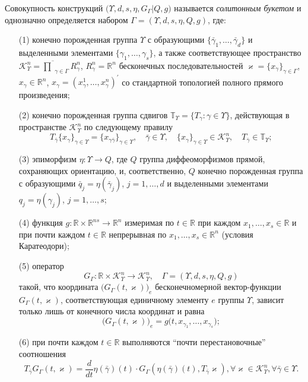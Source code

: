 Совокупность конструкций $\big(\Upsilon,d,s,\eta,G_\Gamma|Q,g\big)$ называется {\it солитонным букетом} и однозначно определяется набором $\Gamma=(\Upsilon,d,s,\eta,Q,g)$, где:
\begin{itemize}
\item[(1)] конечно порожденная группа $\Upsilon$ с образующими $\{\check{\gamma_1},\ldots,\check{\gamma_d}\}$ и выделенными элементами $\{\gamma_1,\ldots,\gamma_s\}$, а также соответствующее пространство $\mathcal K^n_\Upsilon=\overline{\prod}_{\gamma\in \Gamma} R^n_\gamma$, $R^n_\gamma=\mathbb R^n$ бесконечных последовательностей $\varkappa=\{x_\gamma\}_{\gamma\in \Gamma}$, $x_\gamma\in \mathbb R^n$, $x_\gamma=(x_\gamma^1,\ldots, x_\gamma^n)^{'}$ со стандартной топологией полного прямого произведения;
\item[(2)] конечно порожденная группа сдвигов $\mathbb T_\Upsilon=\{T_\gamma: \gamma \in \Upsilon\}$, действующая в пространстве $\mathcal K^n_\Upsilon$ по следующему правилу
    $$
    T_{\bar{\gamma}}\{x_\gamma\}_{\gamma \in \Upsilon }=\{x_{\gamma\bar{\gamma}}\}_{\gamma \in \Upsilon},\quad \bar{\gamma}\in \Upsilon,\quad \{x_\gamma\}_{\gamma \in \Upsilon }\in \mathcal K^n_\Upsilon,\quad T_{\bar{\gamma}} \in \mathbb T_\Upsilon;
    $$
\item[(3)] эпиморфизм $\eta: \Upsilon \rightarrow Q$, где $Q$ группа диффеоморфизмов прямой, сохраняющих ориентацию, и, соответственно, $Q$ конечно порожденная группа с образующими $\check{q_j}=\eta(\check{\gamma_j})$, $j=1,\ldots,d$ и выделенными элементами $q_j=\eta({\gamma_j})$, $j=1,\ldots,s$;
\item[(4)] функция $g:\mathbb R\times \mathbb R^{ns} \rightarrow \mathbb R^{n}$ измеримая по $t\in \mathbb R$ при каждом $x_1,\ldots,x_s\in \mathbb R$ и при почти каждом $t\in \mathbb R$ непрерывная по $x_1,\ldots,x_s\in \mathbb R^n$ (условия Каратеодори);
\item[(5)] оператор
$$
G_{\Gamma}: \mathbb R\times \mathcal K^n_\Upsilon \rightarrow \mathcal K^n_\Upsilon,\quad \Gamma=(\Upsilon,d,s,\eta,Q,g)
$$
такой, что координата $\big(G_{\Gamma}(t,\varkappa)\big)_e$ бесконечномерной вектор-функции $G_{\Gamma}(t,\varkappa)$, соответствующая единичному элементу $e$ группы $\Upsilon$, зависит только лишь от конечного числа координат и равна
$$
\big(G_{\Gamma}(t,\varkappa)\big)_e=g\big(t,x_{{\gamma}_1},\ldots,x_{{\gamma}_s}\big);
$$
\item[(6)] при почти каждом $t \in \mathbb R $ выполняются ``почти перестановочные'' соотношения
$$
T_{\bar\gamma} G_{\Gamma}(t,\varkappa)=\frac{d}{dt}\eta(\bar\gamma)(t)\cdot G_{\Gamma}(\eta(\bar\gamma)(t),T_{\bar\gamma}\varkappa), \forall \varkappa \in \mathcal  K^n_\Upsilon, \forall \bar\gamma\in \Upsilon.
$$
\end{itemize}


